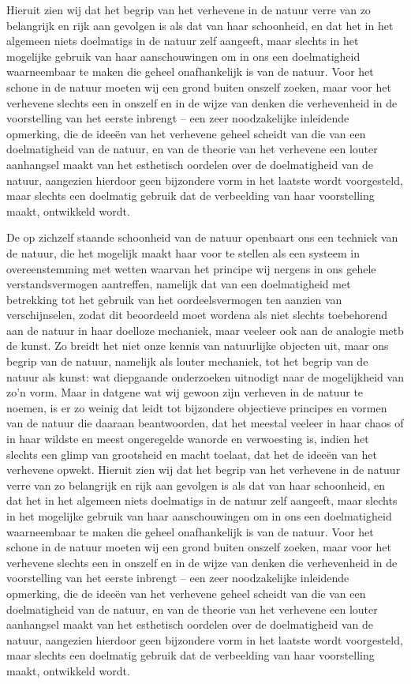 Hieruit zien wij dat het begrip van het verhevene in de natuur verre van zo belangrijk en rijk aan gevolgen is als dat van haar schoonheid, en dat het in het algemeen niets doelmatigs in de natuur zelf aangeeft, maar slechts in het mogelijke gebruik van haar aanschouwingen om in ons een doelmatigheid waarneembaar te maken die geheel onafhankelijk is van de natuur.
Voor het schone in de natuur moeten wij een grond buiten onszelf zoeken, maar voor het verhevene slechts een in onszelf en in de wijze van denken die verhevenheid in de voorstelling van het eerste inbrengt – een zeer noodzakelijke inleidende opmerking, die de ideeën van het verhevene geheel scheidt van die van een doelmatigheid van de natuur, en van de theorie van het verhevene een louter aanhangsel maakt van het esthetisch oordelen over de doelmatigheid van de natuur, aangezien hierdoor geen bijzondere vorm in het laatste wordt voorgesteld, maar slechts een doelmatig gebruik dat de verbeelding van haar voorstelling maakt, ontwikkeld wordt.

De op zichzelf staande schoonheid van de natuur openbaart ons een techniek van de natuur, die het mogelijk maakt haar voor te stellen als een systeem in overeenstemming met wetten waarvan het principe wij nergens in ons gehele verstandsvermogen aantreffen, namelijk dat van een doelmatigheid met betrekking tot het gebruik van het oordeelsvermogen ten aanzien van verschijnselen, zodat dit beoordeeld moet wordena als niet slechts toebehorend aan de natuur in haar doelloze mechaniek, maar veeleer ook aan de analogie metb de kunst.
Zo breidt het niet onze kennis van natuurlijke objecten uit, maar ons begrip van de natuur, namelijk als louter mechaniek, tot het begrip van de natuur als kunst: wat diepgaande onderzoeken uitnodigt naar de mogelijkheid van zo’n vorm.
Maar in datgene wat wij gewoon zijn verheven in de natuur te noemen, is er zo weinig dat leidt tot bijzondere objectieve principes en vormen van de natuur die daaraan beantwoorden, dat het meestal veeleer in haar chaos of in haar wildste en meest ongeregelde wanorde en verwoesting is, indien het slechts een glimp van grootsheid en macht toelaat, dat het de ideeën van het verhevene opwekt.
Hieruit zien wij dat het begrip van het verhevene in de natuur verre van zo belangrijk en rijk aan gevolgen is als dat van haar schoonheid, en dat het in het algemeen niets doelmatigs in de natuur zelf aangeeft, maar slechts in het mogelijke gebruik van haar aanschouwingen om in ons een doelmatigheid waarneembaar te maken die geheel onafhankelijk is van de natuur.
Voor het schone in de natuur moeten wij een grond buiten onszelf zoeken, maar voor het verhevene slechts een in onszelf en in de wijze van denken die verhevenheid in de voorstelling van het eerste inbrengt – een zeer noodzakelijke inleidende opmerking, die de ideeën van het verhevene geheel scheidt van die van een doelmatigheid van de natuur, en van de theorie van het verhevene een louter aanhangsel maakt van het esthetisch oordelen over de doelmatigheid van de natuur, aangezien hierdoor geen bijzondere vorm in het laatste wordt voorgesteld, maar slechts een doelmatig gebruik dat de verbeelding van haar voorstelling maakt, ontwikkeld wordt.

